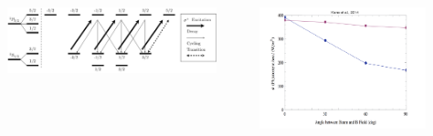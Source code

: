 \documentclass[
30pt,%
a1paper, 
landscape,%
margin = 0mm,
innermargin = -2cm,
colspace = 5mm,
subcolspace = 0mm,
blockverticalspace=.5cm %
]{tikzposter}
\begin{document}
\begin{columns}
{	%

	}


	{

		\begin{minipage}{.15\textwidth}
			\vspace{-4cm}
		\begin{tikzfigure}[]
			\includegraphics[width=0.9\textwidth]{../Thesis/FullPaper/Images/tikz/opticalpumping.pdf}
		\end{tikzfigure}
		\end{minipage}
		\begin{minipage}{.15\textwidth}
			\begin{tikzfigure}[]
			\includegraphics[width=0.8\textwidth]{Images/mrpangle.png}
		\end{tikzfigure}
		\end{minipage}

}
\end{columns}
\end{document}
